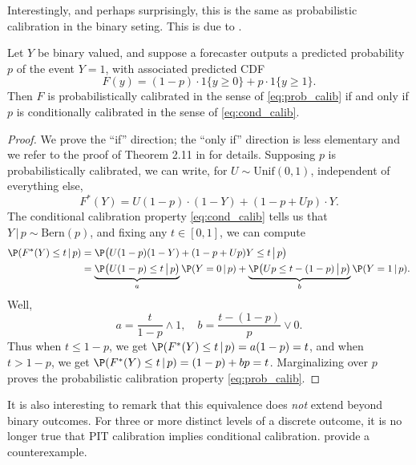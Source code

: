\documentclass{article}
\begin{document}
Interestingly, and perhaps surprisingly, this is the same as probabilistic
calibration in the binary seting. This is due to \citet{gneiting2013combining}. 

\begin{theorem}
Let $Y$ be binary valued, and suppose a forecaster outputs a predicted
probability $p$ of the event $Y = 1$, with associated predicted CDF 
\[
F(y) = (1-p) \cdot 1\{y \geq 0\} +  p \cdot 1\{y \geq 1\}.
\]
Then $F$ is probabilistically calibrated in the sense of \eqref{eq:prob_calib}
if and only if $p$ is conditionally calibrated in the sense of
\eqref{eq:cond_calib}. 
\end{theorem}

\begin{proof}
We prove the ``if'' direction; the ``only if'' direction is less elementary and 
we refer to the proof of Theorem 2.11 in \citet{gneiting2013combining} for
details. Supposing $p$ is probabilistically calibrated, we can write, for $U
\sim \mathrm{Unif}(0,1)$, independent of everything else, 
\[
F^*(Y) = U (1-p) \cdot (1-Y) + (1-p + U p) \cdot Y.
\]
The conditional calibration property \eqref{eq:cond_calib} tells us that
$Y\,|\,p \sim \mathrm{Bern}(p)$, and fixing any $t \in [0,1]$, we can compute   
\begin{align*}
\P(F^*(Y) \leq t \,|\, p) 
&= \P\big(U (1-p) (1-Y) + (1-p + U p) Y \leq t \,\big|\, p \big) \\
&= \underbrace{\P\big(U (1-p) \leq t \,\big|\, p \big)}_{a} \P( Y=0 \,|\, p) +  
\underbrace{\P\big(U p \leq t-(1-p) \,\big|\, p \big)}_{b} \P( Y=1 \,|\, p).
\end{align*}
Well, 
\[
a = \frac{t}{1-p} \wedge 1, 
\quad
b = \frac{t-(1-p)}{p} \vee 0.
\]
Thus when $t \leq 1-p$, we get $\P(F^*(Y) \leq t \,|\, p) = a(1-p) = t$, and
when $t > 1-p$, we get $\P(F^*(Y) \leq t \,|\, p) = (1-p) + bp =
t$. Marginalizing over $p$ proves the probabilistic calibration property
\eqref{eq:prob_calib}.  
\end{proof}

It is also interesting to remark that this equivalence does \emph{not} extend
beyond binary outcomes. For three or more distinct levels of a discrete outcome,
it is no longer true that PIT calibration implies conditional
calibration. \citet{gneiting2022regression} provide a counterexample.  
\end{document}
